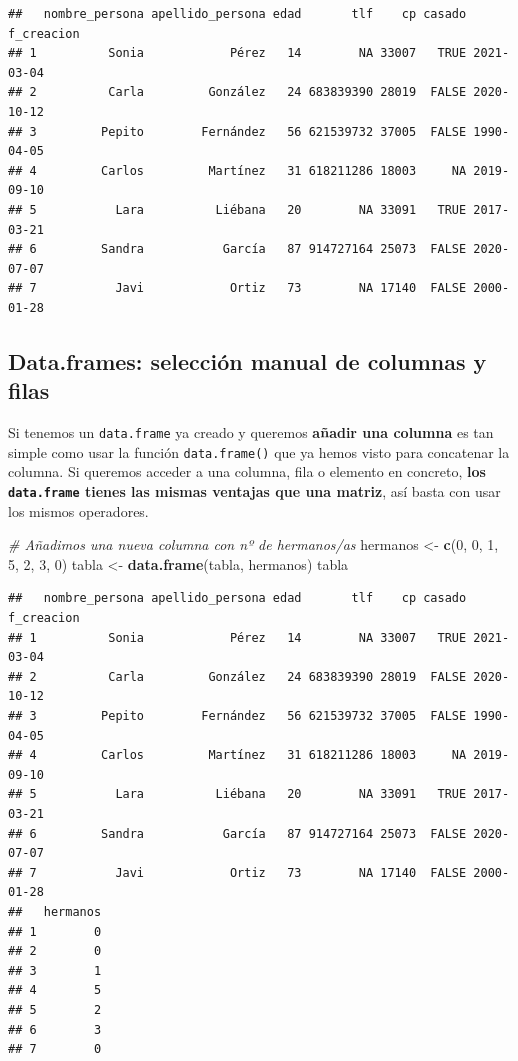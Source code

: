 \documentclass[11pt,]{book}
\newenvironment{Shaded}{\begin{snugshade}}{\end{snugshade}}
\newcommand{\CommentTok}[1]{\textcolor[rgb]{0.37,0.37,0.37}{\textit{#1}}}
\newcommand{\DecValTok}[1]{\textcolor[rgb]{0.06,0.06,0.06}{#1}}
\newcommand{\KeywordTok}[1]{\textcolor[rgb]{0.27,0.27,0.27}{\textbf{#1}}}
\newcommand{\NormalTok}[1]{#1}
\newcommand{\StringTok}[1]{\textcolor[rgb]{0.5,0.5,0.5}{#1}}
\begin{document}
\begin{verbatim}
##   nombre_persona apellido_persona edad       tlf    cp casado f_creacion
## 1          Sonia            Pérez   14        NA 33007   TRUE 2021-03-04
## 2          Carla         González   24 683839390 28019  FALSE 2020-10-12
## 3         Pepito        Fernández   56 621539732 37005  FALSE 1990-04-05
## 4         Carlos         Martínez   31 618211286 18003     NA 2019-09-10
## 5           Lara          Liébana   20        NA 33091   TRUE 2017-03-21
## 6         Sandra           García   87 914727164 25073  FALSE 2020-07-07
## 7           Javi            Ortiz   73        NA 17140  FALSE 2000-01-28
\end{verbatim}

\hypertarget{data.frames-selecciuxf3n-manual-de-columnas-y-filas}{%
\subsection{Data.frames: selección manual de columnas y filas}\label{data.frames-selecciuxf3n-manual-de-columnas-y-filas}}

Si tenemos un \texttt{data.frame} ya creado y queremos \textbf{añadir una columna} es tan simple como usar la función \texttt{data.frame()} que ya hemos visto para concatenar la columna. Si queremos acceder a una columna, fila o elemento en concreto, \textbf{los \texttt{data.frame} tienes las mismas ventajas que una matriz}, así basta con usar los mismos operadores.

\begin{Shaded}
\begin{Highlighting}[]
\CommentTok{# Añadimos una nueva columna con nº de hermanos/as}
\NormalTok{hermanos <-}\StringTok{ }\KeywordTok{c}\NormalTok{(}\DecValTok{0}\NormalTok{, }\DecValTok{0}\NormalTok{, }\DecValTok{1}\NormalTok{, }\DecValTok{5}\NormalTok{, }\DecValTok{2}\NormalTok{, }\DecValTok{3}\NormalTok{, }\DecValTok{0}\NormalTok{)}
\NormalTok{tabla <-}\StringTok{ }\KeywordTok{data.frame}\NormalTok{(tabla, hermanos)}
\NormalTok{tabla}
\end{Highlighting}
\end{Shaded}

\begin{verbatim}
##   nombre_persona apellido_persona edad       tlf    cp casado f_creacion
## 1          Sonia            Pérez   14        NA 33007   TRUE 2021-03-04
## 2          Carla         González   24 683839390 28019  FALSE 2020-10-12
## 3         Pepito        Fernández   56 621539732 37005  FALSE 1990-04-05
## 4         Carlos         Martínez   31 618211286 18003     NA 2019-09-10
## 5           Lara          Liébana   20        NA 33091   TRUE 2017-03-21
## 6         Sandra           García   87 914727164 25073  FALSE 2020-07-07
## 7           Javi            Ortiz   73        NA 17140  FALSE 2000-01-28
##   hermanos
## 1        0
## 2        0
## 3        1
## 4        5
## 5        2
## 6        3
## 7        0
\end{verbatim}
\end{document}
